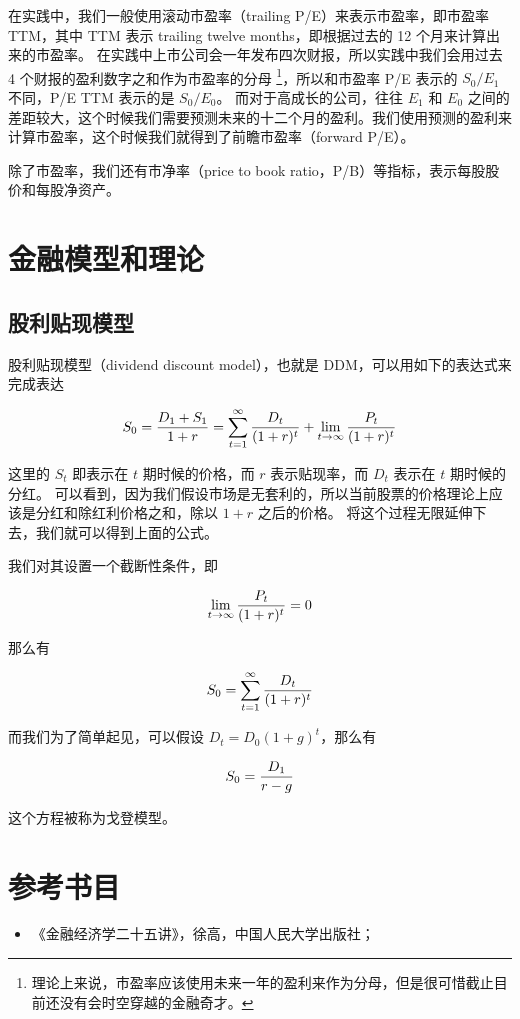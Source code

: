 \documentclass[utf8,a4paper,nofonts]{ctexbook}
\begin{document}
在实践中，我们一般使用滚动市盈率（trailing P/E）来表示市盈率，即市盈率 TTM，其中 TTM 表示 trailing twelve months，即根据过去的 12 个月来计算出来的市盈率。
在实践中上市公司会一年发布四次财报，所以实践中我们会用过去 4 个财报的盈利数字之和作为市盈率的分母
\footnote{理论上来说，市盈率应该使用未来一年的盈利来作为分母，但是很可惜截止目前还没有会时空穿越的金融奇才。}，所以和市盈率 P/E 表示的 $S_0 / E_1$ 不同，P/E TTM 表示的是 $S_0 / E_0$。
而对于高成长的公司，往往 $E_1$ 和 $E_0$ 之间的差距较大，这个时候我们需要预测未来的十二个月的盈利。我们使用预测的盈利来计算市盈率，这个时候我们就得到了前瞻市盈率（forward P/E）。

除了市盈率，我们还有市净率（price to book ratio，P/B）等指标，表示每股股价和每股净资产。

\section{金融模型和理论}

\subsection{股利贴现模型}
\label{title:DDM}

股利贴现模型（dividend discount model），也就是 DDM，可以用如下的表达式来完成表达

$$
S_0 = {D_1 + S_1 \over 1 + r} = \sum_{t=1}^{\infty} {D_t \over (1 + r)^t} + \lim_{t \to \infty} {P_t \over (1 + r)^t}
$$

这里的 $S_t$ 即表示在 $t$ 期时候的价格，而 $r$ 表示贴现率，而 $D_t$ 表示在 $t$ 期时候的分红。
可以看到，因为我们假设市场是无套利的，所以当前股票的价格理论上应该是分红和除红利价格之和，除以 $1 + r$ 之后的价格。
将这个过程无限延伸下去，我们就可以得到上面的公式。

我们对其设置一个截断性条件，即

$$
\lim_{t \to \infty} {P_t \over (1 + r)^t} = 0
$$

那么有

$$
S_0 = \sum_{t=1}^{\infty} {D_t \over (1 + r)^t}
$$

而我们为了简单起见，可以假设 $D_t = D_0 (1 + g)^t$，那么有

$$
S_0 = {D_1 \over r - g}
$$

这个方程被称为戈登模型。

\section{参考书目}

\begin{itemize}
    \item 《金融经济学二十五讲》，徐高，中国人民大学出版社；
\end{itemize}
\end{document}
